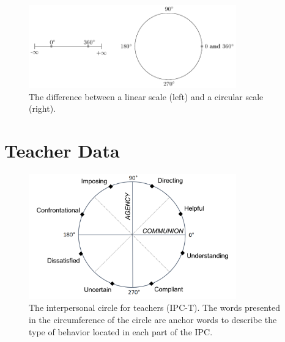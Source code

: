 \documentclass[man]{apa6}
\theoremstyle{definition}
\theoremstyle{definition}
\theoremstyle{definition}
\theoremstyle{remark}
\begin{document}
\begin{figure}
\centering
\includegraphics[width = 0.8\textwidth]{Plots/circline.pdf}
\caption{The difference between a linear scale (left) and a circular scale (right).}
\label{circline}
\end{figure}

\section{Teacher Data}\label{Example}

\begin{figure}
\centering
\includegraphics[width = 0.8\textwidth]{Plots/IPC-T.png}
\caption{The interpersonal circle for teachers (IPC-T). The words presented in
the circumference of the circle are anchor words to describe the type of
behavior located in each part of the IPC.}
\label{QTI}
\end{figure}
\end{document}
